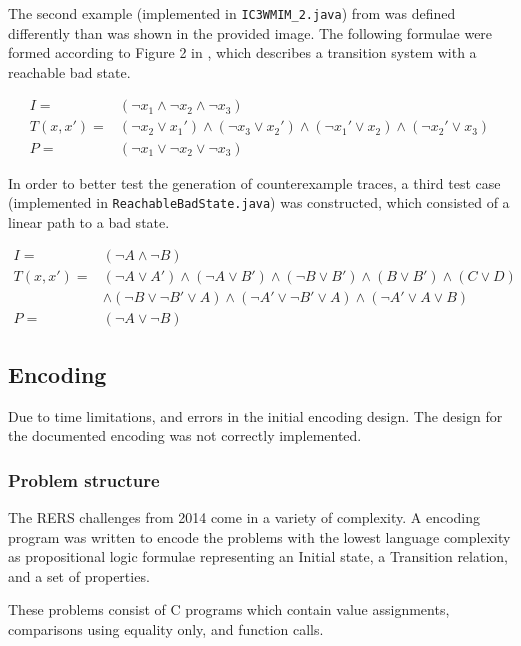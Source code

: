 \documentclass[a4paper]{article}
\begin{document}
The second example (implemented in \texttt{IC3WMIM\_2.java}) from \cite{Somenzi2011} was defined differently than was shown in the provided image.
The following formulae were formed according to Figure 2 in \cite{Somenzi2011}, which describes a transition system with a reachable bad state.

\begin{align*}
I =& (\lnot x_1 \land \lnot x_2 \land \lnot x_3)\\
T(x,x') =& (\lnot x_2 \lor x_1') \land (\lnot x_3 \lor x_2') \land (\lnot x_1' \lor x_2) \land (\lnot x_2' \lor x_3)\\
P =& (\lnot x_1 \lor \lnot x_2 \lor \lnot x_3)
\end{align*}

In order to better test the generation of counterexample traces, a third test case (implemented in \texttt{ReachableBadState.java}) was constructed, which consisted of a linear path to a bad state.

\begin{align*}
I =& (\lnot A \land \lnot B)\\
T(x,x') =& (\lnot A \lor A') \land (\lnot A \lor B') \land (\lnot B \lor B') \land (B \lor B') \land (C \lor D)\\
&\land (\lnot B \lor \lnot B' \lor A) \land (\lnot A' \lor \lnot B' \lor A) \land (\lnot A' \lor A \lor B)\\
P =& (\lnot A \lor \lnot B)
\end{align*}

\subsection{Encoding}
\label{sec:enc}
Due to time limitations, and errors in the initial encoding design. The design for the documented encoding was not correctly implemented.

\subsubsection{Problem structure}
The RERS challenges from 2014 come in a variety of complexity. A encoding program was written to encode the problems with the lowest language complexity as propositional logic formulae representing an Initial state, a Transition relation, and a set of properties.

These problems consist of C programs which contain value assignments, comparisons using equality only, and function calls.
\end{document}
